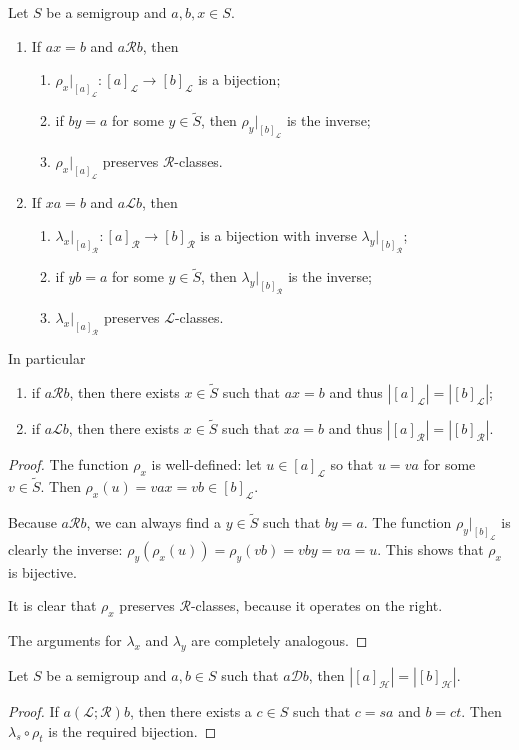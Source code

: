 \begin{proposition} \label{GreensLemma}
Let $S$ be a semigroup and $a,b,x \in S$.
\begin{enumerate}
\item If $ax = b$ and $a\mathcal{R}b$, then
\begin{enumerate}
\item $\rho_x|_{[a]_\mathcal{L}}: [a]_\mathcal{L} \to [b]_\mathcal{L}$ is a bijection;
\item if $by = a$ for some $y\in \widetilde{S}$, then $\rho_y|_{[b]_\mathcal{L}}$ is the inverse;
\item $\rho_x|_{[a]_\mathcal{L}}$ preserves $\mathcal{R}$-classes.
\end{enumerate}
\item If $xa = b$ and $a\mathcal{L}b$, then
\begin{enumerate}
\item $\lambda_x|_{[a]_\mathcal{R}}: [a]_\mathcal{R} \to [b]_\mathcal{R}$ is a bijection with inverse $\lambda_y|_{[b]_\mathcal{R}}$;
\item if $yb = a$ for some $y\in \widetilde{S}$, then $\lambda_y|_{[b]_\mathcal{R}}$ is the inverse;
\item $\lambda_x|_{[a]_\mathcal{R}}$ preserves $\mathcal{L}$-classes.
\end{enumerate} 
\end{enumerate}
In particular
\begin{enumerate}
\item if $a\mathcal{R}b$, then there exists $x\in \widetilde{S}$ such that $ax = b$ and thus $|[a]_\mathcal{L}| = |[b]_\mathcal{L}|$;
\item if $a\mathcal{L}b$, then there exists $x\in \widetilde{S}$ such that $xa = b$ and thus $|[a]_\mathcal{R}| = |[b]_\mathcal{R}|$.
\end{enumerate}
\end{proposition}
\begin{proof}
The function $\rho_x$ is well-defined: let $u\in [a]_\mathcal{L}$ so that $u = va$ for some $v\in \widetilde{S}$. Then $\rho_x(u) = vax = vb \in [b]_\mathcal{L}$.

Because $a\mathcal{R}b$, we can always find a $y\in \widetilde{S}$ such that $by = a$. The function $\rho_y|_{[b]_\mathcal{L}}$ is clearly the inverse: $\rho_y(\rho_x(u)) = \rho_y(vb) = vby = va = u$. This shows that $\rho_x$ is bijective.

It is clear that $\rho_x$ preserves $\mathcal{R}$-classes, because it operates on the right.

The arguments for $\lambda_x$ and $\lambda_y$ are completely analogous.
\end{proof}
\begin{corollary}
Let $S$ be a semigroup and $a,b\in S$ such that $a\mathcal{D}b$, then $|[a]_\mathcal{H}| = |[b]_\mathcal{H}|$.
\end{corollary}
\begin{proof}
If $a(\mathcal{L};\mathcal{R})b$, then there exists a $c\in S$ such that $c = sa$ and $b = ct$. Then $\lambda_s\circ \rho_t$ is the required bijection.
\end{proof}

